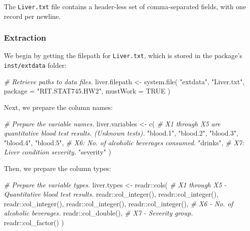 \documentclass[
  11pt,
  a4paper,
]{scrartcl}
\newenvironment{Shaded}{\begin{snugshade}}{\end{snugshade}}
\newcommand{\AttributeTok}[1]{\textcolor[rgb]{0.77,0.63,0.00}{#1}}
\newcommand{\CommentTok}[1]{\textcolor[rgb]{0.56,0.35,0.01}{\textit{#1}}}
\newcommand{\ConstantTok}[1]{\textcolor[rgb]{0.00,0.00,0.00}{#1}}
\newcommand{\FunctionTok}[1]{\textcolor[rgb]{0.00,0.00,0.00}{#1}}
\newcommand{\NormalTok}[1]{#1}
\newcommand{\OtherTok}[1]{\textcolor[rgb]{0.56,0.35,0.01}{#1}}
\newcommand{\SpecialCharTok}[1]{\textcolor[rgb]{0.00,0.00,0.00}{#1}}
\newcommand{\StringTok}[1]{\textcolor[rgb]{0.31,0.60,0.02}{#1}}
\begin{document}
The \texttt{Liver.txt} file contains a header-less set of
comma-separated fields, with one record per newline.

\hypertarget{extraction}{%
\subsubsection{Extraction}\label{extraction}}

We begin by getting the filepath for \texttt{Liver.txt}, which is stored
in the package's \texttt{inst/extdata} folder:

\begin{Shaded}
\begin{Highlighting}[]
\CommentTok{\# Retrieve paths to data files.}
\NormalTok{liver.filepath }\OtherTok{\textless{}{-}} \FunctionTok{system.file}\NormalTok{(}
  \StringTok{"extdata"}\NormalTok{,}
  \StringTok{"Liver.txt"}\NormalTok{,}
  \AttributeTok{package =} \StringTok{"RIT.STAT745.HW2"}\NormalTok{,}
  \AttributeTok{mustWork =} \ConstantTok{TRUE}
\NormalTok{)}
\end{Highlighting}
\end{Shaded}

Next, we prepare the column names:

\begin{Shaded}
\begin{Highlighting}[]
\CommentTok{\# Prepare the variable names.}
\NormalTok{liver.variables }\OtherTok{\textless{}{-}} \FunctionTok{c}\NormalTok{(}
  \CommentTok{\# X1 through X5 are quantitative blood test results. (Unknown tests).}
  \StringTok{"blood.1"}\NormalTok{,}
  \StringTok{"blood.2"}\NormalTok{,}
  \StringTok{"blood.3"}\NormalTok{,}
  \StringTok{"blood.4"}\NormalTok{,}
  \StringTok{"blood.5"}\NormalTok{,}
  \CommentTok{\# X6: No. of alcoholic beverages consumed.}
  \StringTok{"drinks"}\NormalTok{,}
  \CommentTok{\# X7: Liver condition severity.}
  \StringTok{"severity"}
\NormalTok{)}
\end{Highlighting}
\end{Shaded}

Then, we prepare the column types:

\begin{Shaded}
\begin{Highlighting}[]
\CommentTok{\# Prepare the variable types.}
\NormalTok{liver.types }\OtherTok{\textless{}{-}}\NormalTok{ readr}\SpecialCharTok{::}\FunctionTok{cols}\NormalTok{(}
  \CommentTok{\# X1 through X5 {-} Quantitative blood test results.}
\NormalTok{  readr}\SpecialCharTok{::}\FunctionTok{col\_integer}\NormalTok{(),}
\NormalTok{  readr}\SpecialCharTok{::}\FunctionTok{col\_integer}\NormalTok{(),}
\NormalTok{  readr}\SpecialCharTok{::}\FunctionTok{col\_integer}\NormalTok{(),}
\NormalTok{  readr}\SpecialCharTok{::}\FunctionTok{col\_integer}\NormalTok{(),}
\NormalTok{  readr}\SpecialCharTok{::}\FunctionTok{col\_integer}\NormalTok{(),}
  \CommentTok{\# X6 {-} No. of alcoholic beverages.}
\NormalTok{  readr}\SpecialCharTok{::}\FunctionTok{col\_double}\NormalTok{(),}
  \CommentTok{\# X7 {-} Severity group.}
\NormalTok{  readr}\SpecialCharTok{::}\FunctionTok{col\_factor}\NormalTok{()}
\NormalTok{)}
\end{Highlighting}
\end{Shaded}
\end{document}
